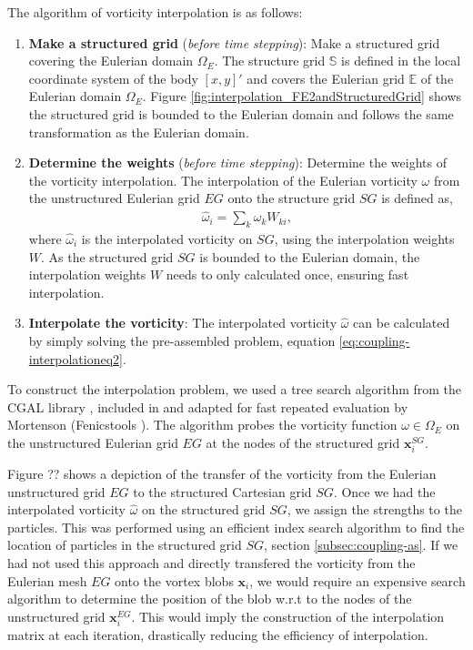 	The algorithm of vorticity interpolation is as follows:
	\begin{enumerate}[label=1.\alph*)]
	\item \textbf{Make a structured grid} (\textit{before time stepping}): Make a structured grid covering the Eulerian domain $\Omega_E$. The structure grid $\mathbb{S}$ is defined in the local coordinate system of the body $[x,y]'$ and covers the Eulerian grid $\mathbb{E}$ of the Eulerian domain $\Omega_E$. Figure \ref{fig:interpolation_FE2andStructuredGrid} shows the structured grid is bounded to the Eulerian domain and follows the same transformation as the Eulerian domain.
	
	\item \textbf{Determine the weights} (\textit{before time stepping}): Determine the weights of the vorticity interpolation. The interpolation of the Eulerian vorticity $\omega$ from the unstructured Eulerian grid $EG$ onto the structure grid $SG$ is defined as,
		\begin{eqnarray}
		\hat{\omega}_i = \sum_k \omega_k W_{ki},
		\label{eq:coupling-interpolationeq2}
		\end{eqnarray}
	where $\hat{\omega}_i$ is the interpolated vorticity on $SG$, using the interpolation weights $W$. As the structured grid $SG$ is bounded to the Eulerian domain, the interpolation weights $W$ needs to only calculated once, ensuring fast interpolation.
	
	\item \textbf{Interpolate the vorticity}: The interpolated vorticity $\hat{\omega}$ can be calculated by simply solving the pre-assembled problem, equation \ref{eq:coupling-interpolationeq2}. 
	\end{enumerate}
	
	To construct the interpolation problem, we used a tree search algorithm from the CGAL library \cite{CGAL}, included in \fenics and adapted for fast repeated evaluation by Mortenson (Fenicstools \cite{fenicstools}). The algorithm probes the vorticity function $\omega\in{\Omega_E}$ on the unstructured Eulerian grid $EG$ at the nodes of the structured grid $\mathbf{x}_i^{SG}$.
	
	Figure ?? shows a depiction of the transfer of the vorticity from the Eulerian unstructured grid $EG$ to the structured Cartesian grid $SG$. Once we had the interpolated vorticity $\hat{\omega}$ on the structured grid $SG$, we assign the strengths to the particles. This was performed using an efficient index search algorithm to find the location of particles in the structured grid $SG$, section \ref{subsec:coupling-as}. If we had not used this approach and directly transfered the vorticity from the Eulerian mesh $EG$ onto the vortex blobs $\mathbf{x}_i$, we would require an expensive search algorithm to determine the position of the blob w.r.t to the nodes of the unstructured grid $\mathbf{x}_{i}^{EG}$. This would imply the construction of the interpolation matrix at each iteration, drastically reducing the efficiency of interpolation.
		
